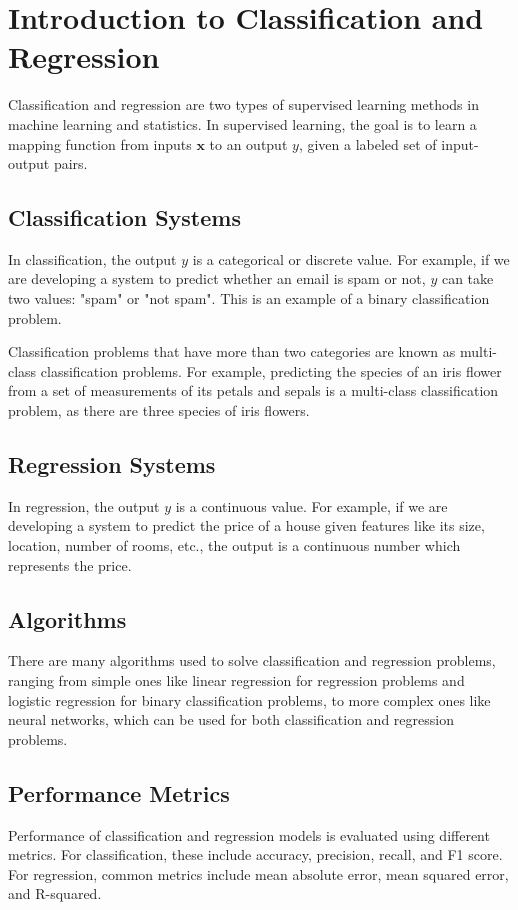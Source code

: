 \chapter{Introduction to Classification and Regression}


Classification and regression are two types of supervised learning
methods in machine learning and statistics. In supervised learning,
the goal is to learn a mapping function from inputs $\mathbf{x}$ to an
output $y$, given a labeled set of input-output pairs.

\section{Classification Systems}

In classification, the output $y$ is a categorical or discrete
value. For example, if we are developing a system to predict whether
an email is spam or not, $y$ can take two values: "spam" or "not
spam". This is an example of a binary classification problem.

Classification problems that have more than two categories are known
as multi-class classification problems. For example, predicting the
species of an iris flower from a set of measurements of its petals and
sepals is a multi-class classification problem, as there are three
species of iris flowers.

\section{Regression Systems}

In regression, the output $y$ is a continuous value. For example, if
we are developing a system to predict the price of a house given
features like its size, location, number of rooms, etc., the output is
a continuous number which represents the price.

\section{Algorithms}

There are many algorithms used to solve classification and regression
problems, ranging from simple ones like linear regression for
regression problems and logistic regression for binary classification
problems, to more complex ones like neural networks, which can be used
for both classification and regression problems.

\section{Performance Metrics}

Performance of classification and regression models is evaluated using
different metrics. For classification, these include accuracy,
precision, recall, and F1 score. For regression, common metrics
include mean absolute error, mean squared error, and R-squared.
